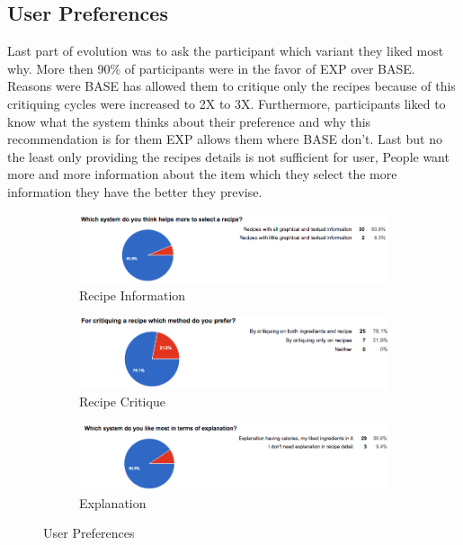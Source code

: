 \subsection{User Preferences}
Last part of evolution was to ask the participant which variant they liked most why. More then 90\% of participants were in the favor of EXP over BASE. Reasons were BASE has allowed them to critique only the recipes because of this critiquing cycles were increased to 2X to 3X. Furthermore, participants liked to know what the system thinks about their preference and why this recommendation is for them EXP allows them where BASE don’t. Last but no the least only providing the recipes details is not sufficient for user, People want more and more information about the item which they select the more information they have the better they previse. 
	  \begin{figure}[h]
	  	\centering
	  	\begin{subfigure}{.80\textwidth}
	  		\includegraphics[width=.9\linewidth]{figures/ch5_stat_user_preference_recipe_info}
	  		\caption{Recipe Information}
	  	\end{subfigure}
	  	\begin{subfigure}{.80\textwidth}
	  		\includegraphics[width=.9\linewidth]{figures/ch5_stat_user_preference_recipe_critique}
	  		\caption{Recipe Critique}
	  	\end{subfigure}
	  	\begin{subfigure}{.80\textwidth}
	  		\includegraphics[width=.9\linewidth]{figures/ch5_stat_user_preference_recipe_explanation}
	  		\caption{Explanation}
	  	\end{subfigure}
	  	\caption{User Preferences}
	  	\label{fig:ch5_stat_user_preference}
	  \end{figure}
	  

